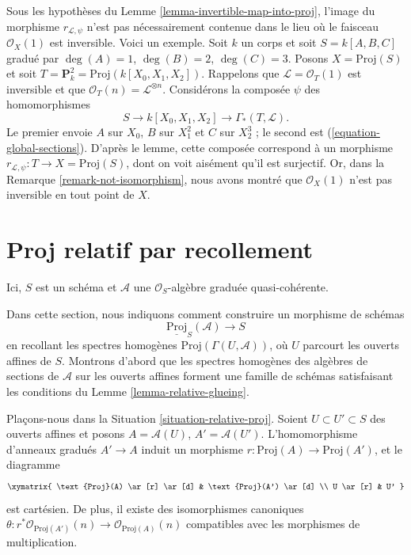 \begin{remark}
\label{remark-not-in-invertible-locus}
Sous les hypothèses du Lemme \ref{lemma-invertible-map-into-proj}, l'image
du morphisme $r_{\mathcal{L}, \psi}$ n'est pas nécessairement contenue dans
le lieu où le faisceau $\mathcal{O}_X(1)$ est inversible. Voici un exemple.
Soit $k$ un corps et soit $S = k[A, B, C]$ gradué par
$\deg(A) = 1$, $\deg(B) = 2$, $\deg(C) = 3$.
Posons $X = \text{Proj}(S)$ et soit
$T = \mathbf{P}^2_k = \text{Proj}(k[X_0, X_1, X_2])$.
Rappelons que $\mathcal{L} = \mathcal{O}_T(1)$ est inversible et que
$\mathcal{O}_T(n) = \mathcal{L}^{\otimes n}$.
Considérons la composée $\psi$ des homomorphismes
$$
S \to k[X_0, X_1, X_2] \to \Gamma_*(T, \mathcal{L}).
$$
Le premier envoie $A$ sur $X_0$, $B$ sur $X_1^2$ et $C$ sur $X_2^3$ ;
le second est (\ref{equation-global-sections}). D'après le lemme, cette
composée correspond à un morphisme
$r_{\mathcal{L}, \psi} : T \to X = \text{Proj}(S)$, dont on voit aisément
qu'il est surjectif. Or, dans la Remarque \ref{remark-not-isomorphism},
nous avons montré que $\mathcal{O}_X(1)$ n'est pas inversible en tout point
de $X$.
\end{remark}


\section{Proj relatif par recollement}
\label{section-relative-proj-via-glueing}

\begin{situation}
\label{situation-relative-proj}
Ici, $S$ est un schéma et $\mathcal{A}$ une $\mathcal{O}_S$-algèbre graduée
quasi-cohérente.
\end{situation}

\noindent
Dans cette section, nous indiquons comment construire un morphisme de schémas
$$
\underline{\text{Proj}}_S(\mathcal{A}) \longrightarrow S
$$
en recollant les spectres homogènes $\text{Proj}(\Gamma(U, \mathcal{A}))$,
où $U$ parcourt les ouverts affines de $S$. Montrons d'abord que les spectres
homogènes des algèbres de sections de $\mathcal{A}$ sur les ouverts affines
forment une famille de schémas satisfaisant les conditions du
Lemme \ref{lemma-relative-glueing}.

\begin{lemma}
\label{lemma-proj-inclusion}
Plaçons-nous dans la Situation \ref{situation-relative-proj}.
Soient $U \subset U' \subset S$ des ouverts affines et posons
$A = \mathcal{A}(U)$, $A' = \mathcal{A}(U')$.
L'homomorphisme d'anneaux gradués $A' \to A$ induit un morphisme
$r : \text{Proj}(A) \to \text{Proj}(A')$, et le diagramme
$$
\xymatrix{
\text{Proj}(A) \ar[r] \ar[d] &
\text{Proj}(A') \ar[d] \\
U \ar[r] &
U'
}
$$
est cartésien. De plus, il existe des isomorphismes canoniques
$\theta : r^*\mathcal{O}_{\text{Proj}(A')}(n) \to
\mathcal{O}_{\text{Proj}(A)}(n)$ compatibles avec les morphismes de
multiplication.
\end{lemma}

